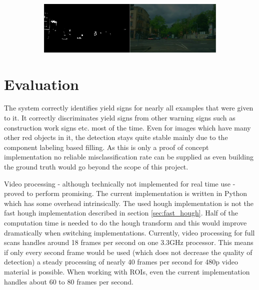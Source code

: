 \documentclass{report}
\begin{document}
\begin{figure}
\begin{subfigure}[t]{1\textwidth}
  \end{subfigure}
  \begin{subfigure}[t]{1\textwidth}
    \includegraphics[width=1\textwidth]{src/roi/5}
  \end{subfigure}
\end{figure}
\restoregeometry

\pagebreak
\chapter{Evaluation}
\label{chap:evaluation}

The system correctly identifies yield signs for nearly all examples
that were given to it. It correctly discriminates yield signs from
other warning signs such as construction work signs etc. most of the
time. Even for images which have many other red objects in it, the
detection stays quite stable mainly due to the component labeling
based filling. As this is only a proof of concept implementation no
reliable misclassification rate can be supplied as even building the
ground truth would go beyond the scope of this project.

Video processing - although technically not implemented for real time
use - proved to perform promising. The current implementation is
written in Python which has some overhead intrinsically. The used
hough implementation is not the fast hough implementation described in
section \ref{sec:fast_hough}. Half of the computation time is needed
to do the hough transform and this would improve dramatically when
switching implementations. Currently, video processing for full scans
handles around 18 frames per second on one 3.3GHz processor. This
means if only every second frame would be used (which does not
decrease the quality of detection) a steady processing of nearly 40
frames per second for 480p video material is possible. When working
with ROIs, even the current implementation handles about 60 to 80
frames per second.
\end{document}

